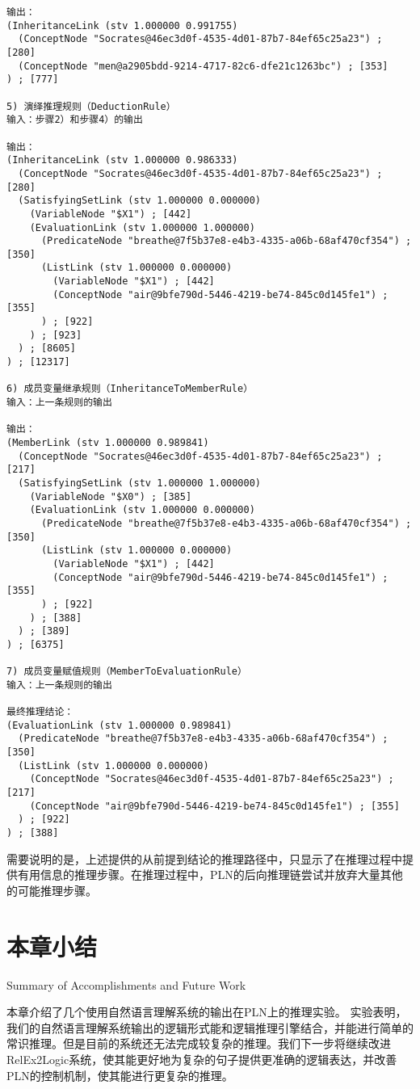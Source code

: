 {\begin{small}
\begin{lstlisting}
输出：
(InheritanceLink (stv 1.000000 0.991755)
  (ConceptNode "Socrates@46ec3d0f-4535-4d01-87b7-84ef65c25a23") ; [280]
  (ConceptNode "men@a2905bdd-9214-4717-82c6-dfe21c1263bc") ; [353]
) ; [777]

5) 演绎推理规则（DeductionRule）
输入：步骤2）和步骤4）的输出

输出：
(InheritanceLink (stv 1.000000 0.986333)
  (ConceptNode "Socrates@46ec3d0f-4535-4d01-87b7-84ef65c25a23") ; [280]
  (SatisfyingSetLink (stv 1.000000 0.000000)
    (VariableNode "$X1") ; [442]
    (EvaluationLink (stv 1.000000 1.000000)
      (PredicateNode "breathe@7f5b37e8-e4b3-4335-a06b-68af470cf354") ; [350]
      (ListLink (stv 1.000000 0.000000)
        (VariableNode "$X1") ; [442]
        (ConceptNode "air@9bfe790d-5446-4219-be74-845c0d145fe1") ; [355]
      ) ; [922]
    ) ; [923]
  ) ; [8605]
) ; [12317]

6) 成员变量继承规则（InheritanceToMemberRule）
输入：上一条规则的输出

输出：
(MemberLink (stv 1.000000 0.989841)
  (ConceptNode "Socrates@46ec3d0f-4535-4d01-87b7-84ef65c25a23") ; [217]
  (SatisfyingSetLink (stv 1.000000 1.000000)
    (VariableNode "$X0") ; [385]
    (EvaluationLink (stv 1.000000 0.000000)
      (PredicateNode "breathe@7f5b37e8-e4b3-4335-a06b-68af470cf354") ; [350]
      (ListLink (stv 1.000000 0.000000)
        (VariableNode "$X1") ; [442]
        (ConceptNode "air@9bfe790d-5446-4219-be74-845c0d145fe1") ; [355]
      ) ; [922]
    ) ; [388]
  ) ; [389]
) ; [6375]

7) 成员变量赋值规则（MemberToEvaluationRule）
输入：上一条规则的输出

最终推理结论：
(EvaluationLink (stv 1.000000 0.989841)
  (PredicateNode "breathe@7f5b37e8-e4b3-4335-a06b-68af470cf354") ; [350]
  (ListLink (stv 1.000000 0.000000)
    (ConceptNode "Socrates@46ec3d0f-4535-4d01-87b7-84ef65c25a23") ; [217]
    (ConceptNode "air@9bfe790d-5446-4219-be74-845c0d145fe1") ; [355]
  ) ; [922]
) ; [388]
 \end{lstlisting}\end{small}}

\noindent 需要说明的是，上述提供的从前提到结论的推理路径中，只显示了在推理过程中提供有用信息的推理步骤。在推理过程中，PLN的后向推理链尝试并放弃大量其他的可能推理步骤。


\section{本章小结}{Summary of Accomplishments and Future Work}

本章介绍了几个使用自然语言理解系统的输出在PLN上的推理实验。 实验表明，我们的自然语言理解系统输出的逻辑形式能和逻辑推理引擎结合，并能进行简单的常识推理。但是目前的系统还无法完成较复杂的推理。我们下一步将继续改进RelEx2Logic系统，使其能更好地为复杂的句子提供更准确的逻辑表达，并改善PLN的控制机制，使其能进行更复杂的推理。
